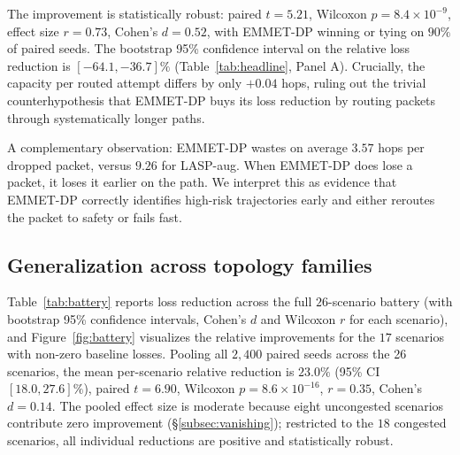 \begin{table}[t]
\centering
\caption{Headline metrics on GÉANT, $100$ seeds. EMMET-DP reduces
congestion losses by $60.2\%$ relative to LASP-aug while consuming
essentially identical network capacity per delivered or routed
packet.}
\label{tab:headline}

\end{table}

The improvement is statistically robust: paired $t = 5.21$, Wilcoxon
$p = 8.4\times 10^{-9}$, effect size $r = 0.73$, Cohen's $d = 0.52$,
with EMMET-DP winning or tying on $90\%$ of paired seeds. The
bootstrap 95\% confidence interval on the relative loss reduction
is $[-64.1, -36.7]\%$ (Table~\ref{tab:headline}, Panel A). Crucially, the capacity per routed attempt
differs by only $+0.04$ hops, ruling out the trivial
counterhypothesis that EMMET-DP buys its loss reduction by routing
packets through systematically longer paths.

A complementary observation: EMMET-DP wastes on average $3.57$ hops
per dropped packet, versus $9.26$ for LASP-aug. When EMMET-DP does
lose a packet, it loses it earlier on the path. We interpret this as
evidence that EMMET-DP correctly identifies high-risk
trajectories early and either reroutes the packet to safety or
fails fast.

\subsection{Generalization across topology families}
\label{subsec:generalization}

Table~\ref{tab:battery} reports loss reduction across the full
$26$-scenario battery (with bootstrap 95\% confidence intervals,
Cohen's $d$ and Wilcoxon $r$ for each scenario), and
Figure~\ref{fig:battery} visualizes the relative improvements
for the $17$ scenarios with non-zero baseline losses. Pooling all $2{,}400$ paired seeds across the 26 scenarios,
the mean per-scenario relative reduction is $23.0\%$
(95\% CI $[18.0, 27.6]\%$), paired $t = 6.90$, Wilcoxon
$p = 8.6\times 10^{-16}$, $r = 0.35$, Cohen's $d = 0.14$.
The pooled effect size is moderate because eight
uncongested scenarios contribute zero improvement
(\S\ref{subsec:vanishing}); restricted to the $18$
congested scenarios, all individual reductions are positive
and statistically robust.

\begin{table}[t]
\centering
\caption{Battery results across $5$ topology families. ``$\Delta$
losses'' is the relative reduction in mean congestion losses
(LASP-aug $\to$ EMMET-DP); negative values indicate EMMET-DP wins.
``--'' marks scenarios with zero LASP-aug losses (uncongested
regime; see \S\ref{subsec:vanishing}).}
\label{tab:battery}
\scriptsize

\end{table}

